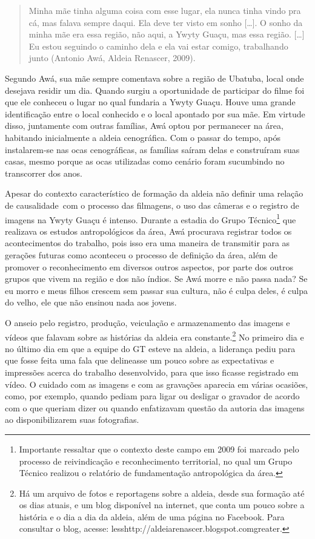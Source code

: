 \begin{quotation}
Minha mãe tinha alguma coisa com esse lugar, ela nunca tinha vindo pra
cá, mas falava sempre daqui. Ela deve ter visto em sonho [\ldots{}]. O sonho
da minha mãe era essa região, não aqui, a Ywyty Guaçu, mas essa região.
[\ldots{}] Eu estou seguindo o caminho dela e ela vai estar comigo,
trabalhando junto (Antonio Awá, Aldeia Renascer, 2009).
\end{quotation}

Segundo Awá, sua mãe sempre comentava sobre a região de Ubatuba, local
onde desejava residir um dia. Quando surgiu a oportunidade de
participar do filme foi que ele conheceu o lugar no qual fundaria a
Ywyty Guaçu. Houve uma grande identificação entre o local conhecido e o
local apontado por sua mãe. Em virtude disso, juntamente com outras
famílias, Awá optou por permanecer na área, habitando inicialmente a
aldeia cenográfica. Com o passar do tempo, após instalarem-se nas ocas
cenográficas, as famílias saíram delas e construíram suas casas, mesmo
porque as ocas utilizadas como cenário foram sucumbindo no transcorrer
dos anos. 

Apesar do contexto característico de formação da aldeia não definir uma
relação de causalidade~com o processo das filmagens, o uso das câmeras
e o registro de imagens na Ywyty Guaçu é intenso. Durante a estadia do
Grupo Técnico\footnote{Importante ressaltar que o contexto deste campo
em 2009 foi marcado pelo processo de reivindicação e reconhecimento
territorial, no qual um Grupo Técnico realizou o relatório de
fundamentação antropológica da área.} que realizava os estudos
antropológicos da área, Awá procurava registrar todos os acontecimentos
do trabalho, pois isso era uma maneira de transmitir para as gerações
futuras como aconteceu o processo de definição da área, além de
promover o reconhecimento em diversos outros aspectos, por parte dos
outros grupos que vivem na região e dos não índios. Se Awá morre e não
passa nada? Se eu morro e meus filhos crescem sem passar sua cultura,
não é culpa deles, é culpa do velho, ele que não ensinou nada aos
jovens. 

O anseio pelo registro, produção, veiculação e armazenamento das imagens
e vídeos que falavam sobre as histórias da aldeia era
constante.\footnote{Há um arquivo de fotos e reportagens sobre a
aldeia, desde sua formação até os dias atuais, e um blog disponível na
internet, que conta um pouco sobre a história e o dia a dia da aldeia,
além de uma página no Facebook. Para consultar o blog, acesse:
{less}http://aldeiarenascer.blogspot.com{greater}.} No
primeiro dia e no último dia em que a equipe do GT esteve na aldeia, a
liderança pediu para que fosse feita uma fala que delineasse um pouco
sobre as expectativas e impressões acerca do trabalho desenvolvido,
para que isso ficasse registrado em vídeo. O cuidado com as imagens e
com as gravações aparecia em várias ocasiões, como, por exemplo, quando
pediam para ligar ou desligar o gravador de acordo com o que queriam
dizer ou quando enfatizavam questão da autoria das imagens ao
disponibilizarem suas fotografias.

